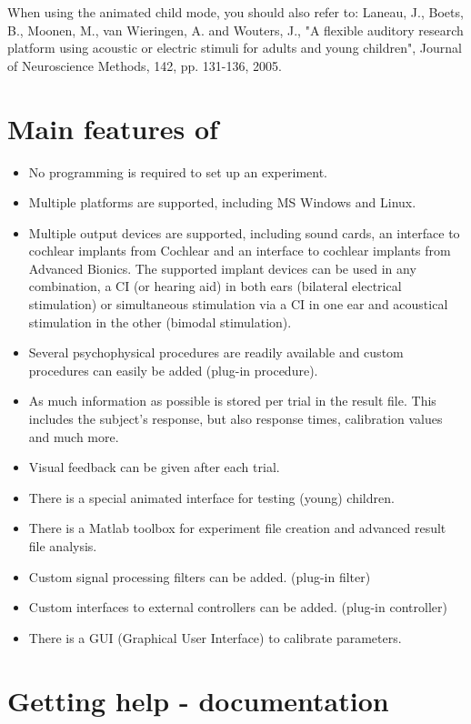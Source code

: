 When using the animated child mode, you should also refer to:
Laneau, J., Boets, B., Moonen, M., van Wieringen, A. and Wouters,
J., "A flexible auditory research platform using acoustic or
electric stimuli for adults and young children", Journal of
Neuroscience Methods, 142, pp. 131-136, 2005.

\section {Main features of \apex}
\begin{itemize}
\item No programming is required to set up an experiment. 
\item
Multiple platforms are supported, including MS Windows and Linux.
\item Multiple output devices are supported, including sound
cards, an interface to cochlear implants from Cochlear and an
interface to cochlear implants from Advanced  Bionics. The
supported implant devices can be used in any combination, a CI (or hearing
aid) in both ears (bilateral electrical stimulation) or
simultaneous stimulation via a CI in one ear and acoustical
stimulation in the other (bimodal stimulation). 
\item Several
psychophysical procedures are readily available and custom
procedures can easily be added (plug-in procedure). 
\item As much
information as possible is stored per trial in the result file.
This includes the subject's response, but also response times,
calibration values and much more. 
\item Visual feedback
can be given after each trial. 
\item There is a special animated
interface for testing (young) children. 
\item There is a Matlab
toolbox for experiment file creation and advanced result file
analysis. 
\item Custom signal processing filters can be added.
(plug-in filter) 
\item Custom interfaces to external controllers
can be added. (plug-in controller) 
\item There is a {GUI}
(Graphical User Interface) to calibrate parameters.
\end{itemize}

\section{Getting help - documentation}

